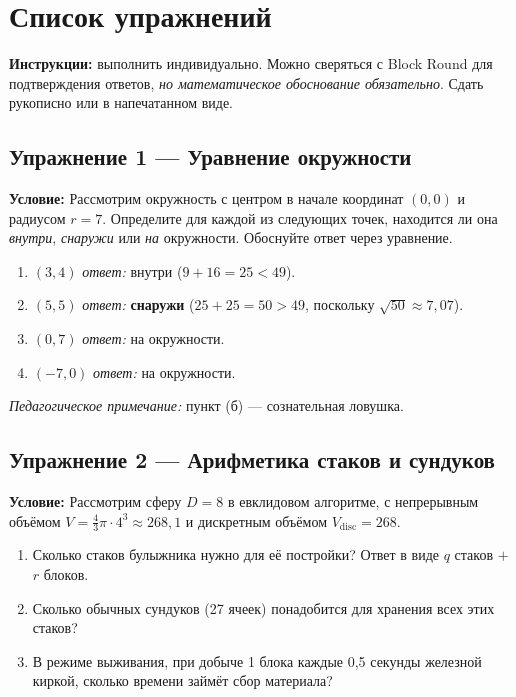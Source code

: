 \documentclass[12pt,a4paper]{scrartcl}
\newcommand{\acc}[1]{\textcolor{accent}{\textbf{#1}}}
\begin{document}
\newpage
\section{Список упражнений}\label{ap:exerc}

\textbf{Инструкции:} выполнить индивидуально. Можно сверяться с Block Round для подтверждения ответов, \emph{но математическое обоснование обязательно}. Сдать рукописно или в напечатанном виде.

\subsection*{Упражнение 1 --- Уравнение окружности}
\textbf{Условие:} Рассмотрим окружность с центром в начале координат $(0, 0)$ и радиусом $r = 7$. Определите для каждой из следующих точек, находится ли она \emph{внутри}, \emph{снаружи} или \emph{на} окружности. Обоснуйте ответ через уравнение.
\begin{enumerate}[label=\alph*),leftmargin=1.5em,itemsep=0.1em,topsep=0.2em,nosep]
  \item $(3, 4)$ \hfill \emph{ответ:} внутри ($9 + 16 = 25 < 49$).
  \item $(5, 5)$ \hfill \emph{ответ:} \acc{снаружи} ($25 + 25 = 50 > 49$, поскольку $\sqrt{50} \approx 7{,}07$).
  \item $(0, 7)$ \hfill \emph{ответ:} на окружности.
  \item $(-7, 0)$ \hfill \emph{ответ:} на окружности.
\end{enumerate}

\textit{Педагогическое примечание:} пункт (б) --- сознательная ловушка.

\subsection*{Упражнение 2 --- Арифметика стаков и сундуков}
\textbf{Условие:} Рассмотрим сферу $D = 8$ в евклидовом алгоритме, с непрерывным объёмом $V = \tfrac{4}{3}\pi \cdot 4^3 \approx 268{,}1$ и дискретным объёмом $V_{\mathrm{disc}} = 268$.
\begin{enumerate}[label=\alph*),leftmargin=1.5em,itemsep=0.1em,topsep=0.2em,nosep]
  \item Сколько стаков булыжника нужно для её постройки? Ответ в виде $q$ стаков $+$ $r$ блоков.
  \item Сколько обычных сундуков (27 ячеек) понадобится для хранения всех этих стаков?
  \item В режиме выживания, при добыче 1 блока каждые 0{,}5 секунды железной киркой, сколько времени займёт сбор материала?
\end{enumerate}
\end{document}
